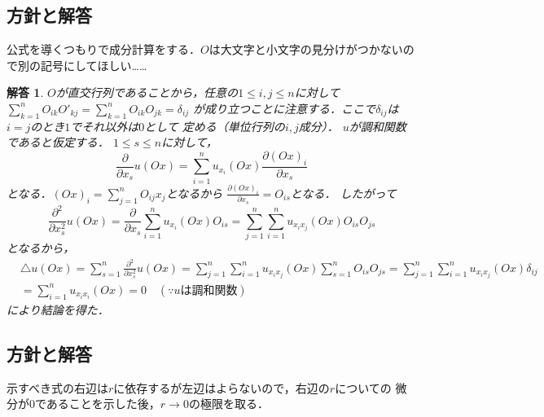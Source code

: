 \documentclass[dvipdfmx,autodetect-engine]{jsarticle}
\newtheorem*{ans}{解答}
\theoremstyle{remark}
\theoremstyle{definition}
\begin{document}
\subsection{方針と解答}
公式を導くつもりで成分計算をする．$O$は大文字と小文字の見分けがつかないので別の記号にしてほしい……
\begin{ans}
    $O$が直交行列であることから，任意の$1\leq i,j \leq n$に対して
    $\sum_{k=1}^{n} O_{ik} O'_{kj} = \sum_{k=1}^{n} O_{ik} O_{jk} = \delta_{ij}$
    が成り立つことに注意する．ここで$\delta_{ij}$は$i=j$のとき$1$でそれ以外は$0$として
    定める（単位行列の$i,j$成分）．
    $u$が調和関数であると仮定する．
    $1\leq s\leq n$に対して，
    \begin{equation}
        \frac{\partial}{\partial x_{s}} u(Ox)
        = \sum_{i=1}^{n} u_{x_{i}}(Ox) \frac{\partial (Ox)_{i}}{\partial x_{s}}
    \end{equation}
    となる．$(Ox)_{i} = \sum_{j=1}^{n} O_{ij}x_{j}$となるから
    $\frac{\partial (Ox)_{i}}{\partial x_{s}} = O_{is}$となる．
    したがって
    \begin{equation}
        \frac{\partial^{2}}{\partial x_{s}^{2}} u(Ox)
        = \frac{\partial}{\partial x_{s}}
        \sum_{i=1}^{n} u_{x_{i}}(Ox) O_{is} 
        = \sum_{j=1}^{n} \sum_{i=1}^{n} u_{x_{i}x_{j}}(Ox) O_{is} O_{js}
    \end{equation}
    となるから，
    \begin{align}
        &\triangle u(Ox) = \sum_{s=1}^{n}  \frac{\partial^{2}}{\partial x_{s}^{2}} u(Ox)
        = \sum_{j=1}^{n} \sum_{i=1}^{n} u_{x_{i}x_{j}}(Ox) \sum_{s=1}^{n}O_{is} O_{js}
        = \sum_{j=1}^{n} \sum_{i=1}^{n} u_{x_{i}x_{j}}(Ox) \delta_{ij} \\
        &= \sum_{i=1}^{n} u_{x_{i}x_{i}}(Ox) = 0\quad(\because u\text{は調和関数})
    \end{align}
    により結論を得た．
\end{ans}


\subsection{方針と解答}
示すべき式の右辺は$r$に依存するが左辺はよらないので，右辺の$r$についての
微分が$0$であることを示した後，$r \to 0$の極限を取る．
\end{document}
